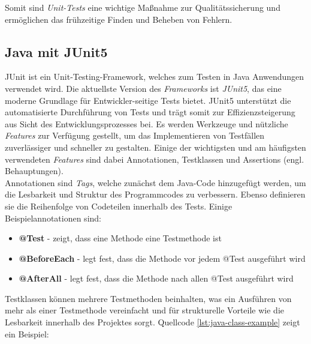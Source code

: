 
\vspace{2cm}
 Somit sind \textit{Unit-Tests} eine wichtige Maßnahme zur Qualitätssicherung und ermöglichen das frühzeitige Finden und Beheben von Fehlern.

\subsection{Java mit JUnit5}
JUnit ist ein Unit-Testing-Framework, welches zum Testen in Java Anwendungen verwendet wird. Die aktuellste Version des \textit{Frameworks} ist \textit{JUnit5}, das eine moderne Grundlage für Entwickler-seitige Tests bietet. \cite*{JUnit} JUnit5 unterstützt die automatisierte Durchführung von Tests und trägt somit zur Effizienzsteigerung aus Sicht des Entwicklungsprozesses bei. \cite*{venkatesanJunitFrameworkUnit} Es werden Werkzeuge und nützliche \textit{Features} zur Verfügung gestellt, um das Implementieren von Testfällen zuverlässiger und schneller zu gestalten. Einige der wichtigsten und am häufigsten verwendeten \textit{Features} sind dabei Annotationen, Testklassen und Assertions (engl. Behauptungen). \cite*{venkatesanJunitFrameworkUnit}\\
Annotationen sind \textit{Tags}, welche zunächst dem Java-Code hinzugefügt werden, um die Lesbarkeit und Struktur des Programmcodes zu verbessern. Ebenso definieren sie die Reihenfolge von Codeteilen innerhalb des Tests. Einige Beispielannotationen sind: \cite*{JUnitUserGuide}
\begin{itemize}
    \setlength{\parskip}{1pt}
    \item \textbf{@Test} - zeigt, dass eine Methode eine Testmethode ist
    \item \textbf{@BeforeEach} - legt fest, dass die Methode vor jedem @Test ausgeführt wird
    \item \textbf{@AfterAll} - legt fest, dass die Methode nach allen @Test ausgeführt wird
\end{itemize}
Testklassen können mehrere Testmethoden beinhalten, was ein Ausführen von mehr als einer Testmethode vereinfacht und für strukturelle Vorteile wie die Lesbarkeit innerhalb des Projektes sorgt. Quellcode \ref{lst:java-class-example} zeigt ein Beispiel:\\

